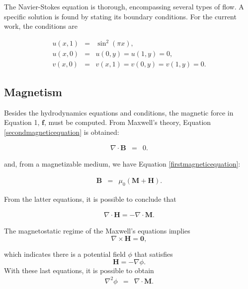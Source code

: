 \documentclass[journal]{IEEEtran}
\begin{document}
The Navier-Stokes equation is thorough, encompassing several types of flow. A specific solution is found by stating its boundary conditions. For the current work, the conditions are

\begin{eqnarray}
u(x,1) & = & \sin^2(\pi x),\label{condition1ns}\\
u(x,0) & = & u(0,y) = u(1,y) = 0,\label{condition2ns}\\
v(x,0) & = & v(x,1) = v(0, y) = v(1, y) = 0.\label{condition3ns}
\end{eqnarray}

\subsection{Magnetism}
Besides the hydrodynamics equations and conditions, the magnetic force  in Equation 1, $\mathbf{f}$, must be computed. From Maxwell's theory, Equation \ref{secondmagneticequation} is obtained:

\begin{eqnarray}
\nabla\cdot \mathbf{B} & = & 0\label{secondmagneticequation}.
\end{eqnarray}

and, from a magnetizable medium, we have Equation \ref{firstmagneticequation}:

\begin{eqnarray}
\mathbf{B} &=& \mu_0(\mathbf{M}+\mathbf{H}).\label{firstmagneticequation}
\end{eqnarray}

From the latter equations, it is possible to conclude that 

\begin{eqnarray}
\nabla\cdot\mathbf{H} = -\nabla\cdot \mathbf{M}\label{mh1}.
\end{eqnarray}

The magnetostatic regime of the Maxwell's equations implies \begin{equation}\nabla\times \mathbf{H} = \mathbf{0},
\end{equation} 

which indicates there is a potential field $\phi$ that satisfies \begin{equation}\mathbf{H} = -\nabla \phi.\label{Hphipotencial}\end{equation} With these last equations, it is possible to obtain \begin{eqnarray}
\nabla^2\phi &=& \nabla\cdot \mathbf{M}.\label{eqcampomag}
\end{eqnarray}
\end{document}
